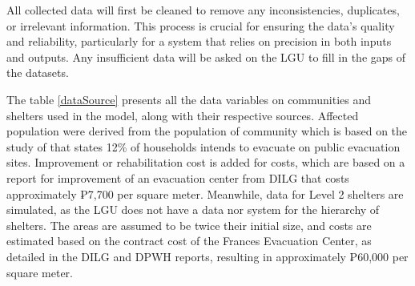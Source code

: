 	All collected data will first be cleaned to remove any inconsistencies, duplicates, or irrelevant information. This process is crucial for ensuring the data’s quality and reliability, particularly for a system that relies on precision in both inputs and outputs. Any insufficient data will be asked on the LGU to fill in the gaps of the datasets. 
	
	The table \ref{dataSource} presents all the data variables on communities and shelters used in the model, along with their respective sources. Affected population were derived from the population of community which is based on the study of \textcite{Opdyke2024} that states 12\% of households intends to evacuate on public evacuation sites. Improvement or rehabilitation cost is added for costs, which are based on a report for improvement of an evacuation center from DILG that costs approximately ₱7,700 per square meter. Meanwhile, data for Level 2 shelters are simulated, as the LGU does not have a data nor system for the hierarchy of shelters. The areas are assumed to be twice their initial size, and costs are estimated based on the contract cost of the Frances Evacuation Center, as detailed in the DILG and DPWH reports, resulting in approximately ₱60,000 per square meter. 
	
